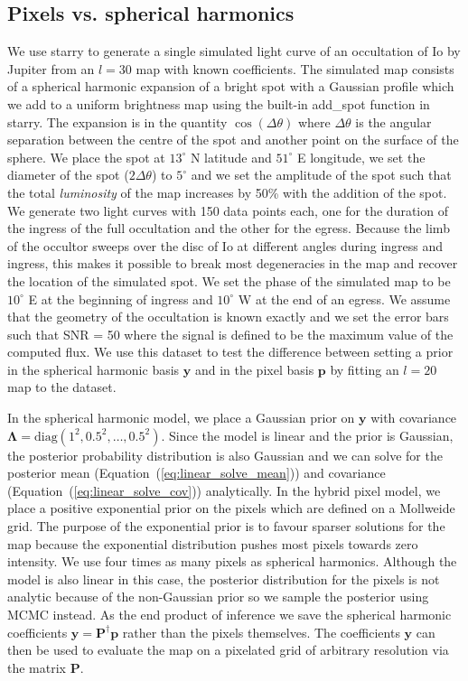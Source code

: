 \documentclass[12pt,dvipsnames]{report}
\begin{document}
\subsection{Pixels vs. spherical harmonics}
\label{ssec:pixels_vs_harmonics}
We use \textsf{starry} to generate a single simulated light curve of an occultation of Io by Jupiter from an $l=30$ map with known coefficients.
The simulated map consists of a spherical harmonic expansion of a bright spot with a Gaussian profile which we add to a uniform brightness map using the built-in \textsf{add\_spot} function in \textsf{starry}.
The expansion is in the quantity $\cos(\Delta\theta)$ where $\Delta\theta$ is the angular separation between the centre of the spot and another point on the surface of the sphere. 
We place the spot at $13^\circ$ N latitude and $51^\circ$ E longitude, we set the diameter of the spot ($2\Delta\theta$) to $5^\circ$ and we set the amplitude of the spot such that the total \emph{luminosity} of the map increases by 50\% with the addition of the spot.
We generate two light curves with 150 data points each, one for the duration of the ingress of the full occultation and the other for the egress.
Because the limb of the occultor sweeps over the disc of Io at different angles during ingress and ingress, this makes it possible to break most degeneracies in the map and recover the location of the simulated spot.
We set the phase of the simulated map to be $10^\circ$ E at the beginning of ingress and $10^\circ$ W at the end of an egress.
We assume that the geometry of the occultation is known exactly and we set the error bars such that SNR = 50 where the signal is defined to be the maximum value of the computed flux.
    We use this dataset to test the difference between setting a prior in the spherical harmonic basis $\mathbf{y}$ and in the pixel basis $\mathbf{p}$ by fitting an $l=20$ map to the dataset.

In the spherical harmonic model, we place a Gaussian prior on $\mathbf{y}$ with covariance $\boldsymbol{\Lambda}=\mathrm{diag}(1^2,0.5^2,\dots,0.5^2)$.
Since the model is linear and the prior is Gaussian, the posterior probability distribution is also Gaussian and we can solve for the posterior mean (Equation~(\ref{eq:linear_solve_mean})) and covariance (Equation~(\ref{eq:linear_solve_cov})) analytically.
In the hybrid pixel model, we place a positive exponential prior on the pixels which are defined on a Mollweide grid. 
The purpose of the exponential prior is to favour sparser solutions for the map because the exponential distribution pushes most pixels towards zero intensity.
We use four times as many pixels as spherical harmonics.
Although the model is also linear in this case, the posterior distribution for the pixels is not analytic because of the non-Gaussian prior so we sample the posterior using MCMC instead.
As the end product of inference we save the spherical harmonic coefficients $\mathbf{y}=\mathbf{P}^\dagger\mathbf{p}$ rather than the pixels themselves.
The coefficients $\mathbf{y}$ can then be used to evaluate the map on a pixelated grid of arbitrary resolution via the matrix $\mathbf{P}$. 
\end{document}
